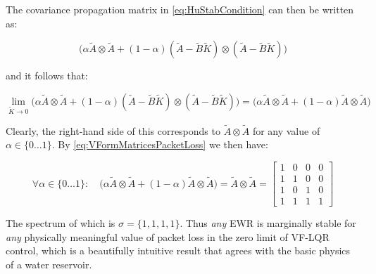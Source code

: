 The covariance propagation matrix in \cref{eq:HuStabCondition} can then be written as:

\begin{equation}
		\Big(\alpha \tilde{A} \otimes \tilde{A} + (1-\alpha)(\tilde{A}-\tilde{B}\tilde{K}) \otimes (\tilde{A}-\tilde{B}\tilde{K}) \Big)
\end{equation}

and it follows that:

\begin{equation}
	\lim_{\tilde{K}\rightarrow 0} \Big(\alpha \tilde{A} \otimes \tilde{A} + (1-\alpha)(\tilde{A}-\tilde{B}\tilde{K}) \otimes (\tilde{A}-\tilde{B}\tilde{K}) \Big) = \Big(\alpha \tilde{A} \otimes \tilde{A} + (1-\alpha)\tilde{A} \otimes \tilde{A}\Big)
\end{equation}

Clearly, the right-hand side of this corresponds to $\tilde{A}\otimes\tilde{A}$ for any value of $\alpha \in \{0 \dots 1\}$. By \cref{eq:VFormMatricesPacketLoss} we then have:

\begin{equation}
	\forall \alpha \in \{0 \dots 1\}: \quad \Big(\alpha \tilde{A} \otimes \tilde{A} + (1-\alpha)\tilde{A} \otimes \tilde{A}\Big) = \tilde{A}\otimes\tilde{A} 
	= \begin{bmatrix}  
		1 & 0 & 0 & 0 \\
		1 & 1 & 0 & 0 \\
		1 & 0 & 1 & 0 \\
		1 & 1 & 1 & 1	
	\end{bmatrix}
\end{equation}

The spectrum of which is $\sigma = \{1,1,1,1\}$. Thus \textit{any} EWR is marginally stable for \textit{any} physically meaningful value of packet loss in the zero limit of VF-LQR control, which is a beautifully intuitive result that agrees with the basic physics of a water reservoir.



